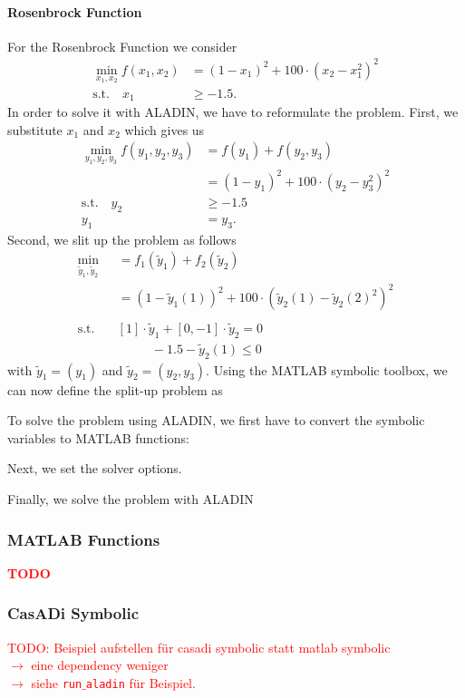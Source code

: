 \documentclass[]{scrartcl}
\begin{document}
\paragraph{Rosenbrock Function} 
For the Rosenbrock Function we consider
\begin{align*}
\min_{x_1, x_2} f(x_1, x_2) &= (1 - x_1)^2 + 100 \cdot (x_2 - x_1^2)^2 \\
\text{s.t.} \quad x_1 & \geq -1.5.
\end{align*}
In order to solve it with ALADIN, we have to reformulate the problem. First, we substitute $x_1$ and $x_2$ which gives us
\begin{align*}
\min_{y_1, y_2, y_3}f(y_1, y_2, y_3) & = f(y_1) + f(y_2, y_3)\\
 & = (1 - y_1)^2 + 100 \cdot (y_2 - y_3^2)^2 \\
\text{s.t.} \quad y_2 & \geq - 1.5\\
y_1 & = y_3. 
\end{align*}
Second, we slit up the problem as follows
\begin{align*}
\min_{\tilde{y}_1, \tilde{y}_2} &= f_1(\tilde{y}_1) + f_2(\tilde{y}_2) \\
& = (1 - \tilde{y}_1(1))^2 + 100 \cdot (\tilde{y}_2(1) - \tilde{y}_2(2)^2)^2 \\ 
\\
\text{s.t.} \quad & [1] \cdot \tilde{y}_1 + [0, -1] \cdot \tilde{y}_2 = 0 \\
\quad \quad & \quad \quad \text{ } -1.5 - \tilde{y}_2(1) \leq 0
\end{align*}
with $\tilde{y}_1 = (y_1)$ and $\tilde{y}_2 = (y_2, y_3)$.
Using the MATLAB symbolic toolbox, we can now define the split-up problem 
as 

To solve the problem using ALADIN, we first have to convert the symbolic variables to MATLAB functions:

Next, we set the solver options.

Finally, we solve the problem with ALADIN


\subsubsection{MATLAB Functions}
\textcolor{red}{\textbf{TODO}} 
\subsubsection{CasADi Symbolic}
\textcolor{red}{TODO: Beispiel aufstellen für casadi symbolic statt matlab symbolic \\
$\rightarrow$ eine dependency weniger\\
$\rightarrow$ siehe \texttt{run$\_$aladin} für Beispiel.}
\end{document}
